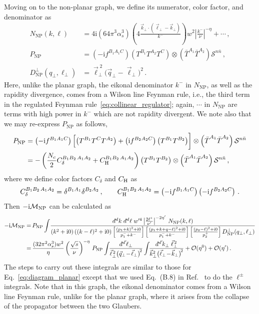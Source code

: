 \documentclass[letterpaper,11pt]{article}
\def\cS{\mathcal{S}}
\newcommand{\eq}[1]{Eq.~\eqref{eq:#1}}
\newcommand{\img}{\mathrm{i}}
\newcommand{\cM}{\mathcal{M}}
\newcommand{\cO}{\mathcal{O}}
\newcommand{\as}{\alpha_s}
\newcommand{\nn}{\nonumber}
\newcommand\prp[1]{\vec #1_\perp}
\newcommand\prpsq[1]{\vec{#1}^{2}_\perp}
\newcommand\prpsqm[2]{\bigl( \prp{#1} \!-\! \prp{#2} \bigr)^{\!2}}
\newcommand\prnth[1]{\left(#1\right)}
\newcommand{\bn}{{\bar n}}
\newcommand{\bT}{{\bar T}}
\newcommand{\dbar}{d\hspace*{-0.08em}\bar{}\hspace*{0.1em}}
\begin{document}
 

Moving on to the non-planar graph, we define its numerator, color factor, and denominator as
%
\begin{align}
	N_\text{NP}(k, \ell) &= 4\img (64 \pi^3 \as^3) \left( 4 \frac{\prp{k} \cdot (\prp{\ell} - \prp{k})}{k^-}\right)  w^2 \left|\frac{k^-}{\nu}\right|^{-\eta}+\cdots
	\,, \nn \\
	P_\text{NP} &= \prnth{-\img f^{B_1A_1C}} \prnth{T^{B_1} T^{A_2} T^{C}} \otimes \prnth{\bT^{A_1} \bT^{A_2 }} \cS^{n\bn}
  \,,\nn \\
%
D_\text{NP}^\perp(q_\perp,\ell_\perp) &= \vec\ell_\perp^{\;2} \prpsqm{q}{\ell}\, .
\end{align}
Here, unlike the planar graph, the eikonal denominator $k^-$ in $N_\text{NP}$, as well as the rapidity divergence, comes from a Wilson line Feynman rule, i.e., the third term in the regulated Feynman rule~\eqref{eq:collinear_regulator};
again, $\cdots$ in $N_\text{NP}$ are terms with high power in $k^-$ which are not rapidity divergent.
We note also that we may re-express $P_{\text{NP}}$ as follows, 
\begin{align} \label{eq:cnp1}
	P_\text{NP} 
  &= \prnth{-\img f^{B_1A_1C}} \Bigl[ \prnth{T^{B_1} T^{C} T^{A_2}} 
  +
  \prnth{\img f^{B_2A_2C}}
  \prnth{T^{B_1} T^{B_2}} \biggr]
  \otimes \prnth{\bT^{A_1} \bT^{A_2 }} \cS^{n\bn}
  \nn\\
%
	&= -\left(\frac{N_c}{2} C_{\delta}^{B_1B_2\,A_1A_2} + C_{\text{H}}^{B_1B_2\,A_1A_2} \right) \prnth{T^{B_1} T^{B_2}} \otimes \prnth{\bT^{A_1} \bT^{A_2}}  \cS^{n\bn}  \,,	
\end{align}
%
where we define color factors $C_\delta$ and $C_{\rm H}$ as
\begin{align}
  C_\delta^{B_1B_2\,A_1A_2}=\delta^{B_1 A_1} \delta^{B_2 A_2}\,,\qquad C_{\rm H}^{B_1B_2\,A_1A_2} = \prnth{-\img f^{B_1 A_1 C}} \prnth{-\img f^{B_2A_2C}}  \,.
\end{align}
Then $-\img\cM_{\rm NP}$ can be calculated as
\begin{align} 
 -\img\cM_{\rm{NP}}
  =\,& P_\text{NP} 
	\int\!\frac{\dbar^dk \; \dbar^d\ell \; w'^4 \left| \frac{2 \ell^z}{\nu'} \right|^{-2 \eta'} \, N_\text{NP}(k,\ell)}{
	\prnth{k^2 + \img0} \prnth{(k-\ell)^2 + \img0} \left[\frac{\prnth{p_1 +k}^2+\img0}{p_1^- + k^-}\right] 
	\left[\frac{\prnth{p_1 + k + q-\ell}^2+\img0}{p_1^- + k^-}\right]
  \left[\frac{\prnth{p_2 - \ell}^2+\img0}{p_2^+}\right]
  D_\text{NP}^\perp(q_\perp,\ell_\perp)
}
\nn \\
=\,& \frac{(32 \pi^2 \as^3) w^2}{\eta} \left(\frac{\sqrt{s}}{\nu} \right)^{-\eta} \, P_\text{NP}
	\int\!\! \frac{\dbar^{d'}\!\ell_\perp}{\vec\ell_\perp^{\,2} \prpsqm{q}{\ell}}
  \int\!\! \frac{\dbar^{d'}\!k_\perp \; \vec\ell_\perp^{\,2}}{
	\prpsq{k} \prpsqm{\ell}{k}
} + \cO(\eta^0)+ \cO(\eta')
 \,.
\end{align}
%
The steps to carry out these integrals are similar to those for \eq{diagram_planar} except that we used Eq.~(B.8) in Ref.~\cite{Rothstein:2016bsq} to do the $\ell^\pm$ integrals. Note that in this graph, the eikonal denominator comes from a Wilson line Feynman rule, unlike for the planar graph, where it arises from the collapse of the propagator between the two Glaubers.
\end{document}
